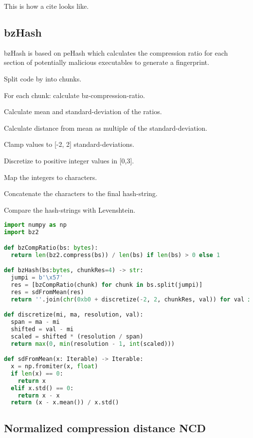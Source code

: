 \documentclass[../main.tex]{subfiles}
\begin{document}
This is how a cite\cite{sung2004static} looks like.

\subsection{bzHash}
bzHash is based on peHash\cite{wicherski2009pehash} which calculates the compression ratio for each section of potentially malicious executables to generate a fingerprint.

\begin{ol}
  \item Split code by  into chunks.
  \item For each chunk: calculate bz-compression-ratio.
  \item Calculate mean and standard-deviation of the ratios.
  \item Calculate distance from mean as multiple of the standard-deviation.
  \item Clamp values to [-2, 2] standard-deviations.
  \item Discretize to positive integer values in [0,3].
  \item Map the integers to characters.
  \item Concatenate the characters to the final hash-string.
  \item Compare the hash-strings with Levenshtein.
\end{ol}

\begin{lstlisting}[style=mystyle,language=Python]
import numpy as np
import bz2

def bzCompRatio(bs: bytes):
  return len(bz2.compress(bs)) / len(bs) if len(bs) > 0 else 1

def bzHash(bs:bytes, chunkRes=4) -> str:
  jumpi = b'\x57'
  res = [bzCompRatio(chunk) for chunk in bs.split(jumpi)]
  res = sdFromMean(res)
  return ''.join(chr(0xb0 + discretize(-2, 2, chunkRes, val)) for val in res)

def discretize(mi, ma, resolution, val):
  span = ma - mi
  shifted = val - mi
  scaled = shifted * (resolution / span)
  return max(0, min(resolution - 1, int(scaled)))

def sdFromMean(x: Iterable) -> Iterable:
  x = np.fromiter(x, float)
  if len(x) == 0:
    return x
  elif x.std() == 0:
    return x - x
  return (x - x.mean()) / x.std()
\end{lstlisting}

\subsection{Normalized compression distance NCD}
\end{document}
